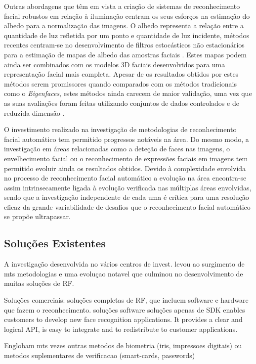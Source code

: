  Outras abordagens que têm em vista a criação de sistemas de reconhecimento facial robustos em relação à iluminação centram os seus esforços na estimação do albedo para a normalização das imagens. O albedo representa a relação entre a quantidade de luz refletida por um ponto e quantidade de luz incidente, métodos recentes centram-se no desenvolvimento de filtros estocásticos não estacionários para a estimação de mapas de albedo das amostras faciais \cite{Biswas2009}. Estes mapas podem ainda ser combinados com os modelos 3D faciais desenvolvidos para uma representação facial mais completa. Apesar de os resultados obtidos por estes métodos serem promissores quando comparados com os métodos tradicionais como o \textit{Eigenfaces}, estes métodos ainda carecem de maior validação, uma vez que as suas avaliações foram feitas utilizando conjuntos de dados controlados e de reduzida dimensão \citep{Chellappa2010}.
 
O investimento realizado na investigação de metodologias de reconhecimento facial automático tem permitido progressos notáveis na área. Do mesmo modo, a investigação em áreas relacionadas como a deteção de faces nas imagens, o envelhecimento facial ou o reconhecimento de expressões faciais em imagens tem permitido evoluir ainda os resultados obtidos. Devido à complexidade envolvida no processo de reconhecimento facial automático a evolução na área encontra-se assim intrinsecamente ligada à evolução verificada nas múltiplas áreas envolvidas, sendo que a investigação independente de cada uma é crítica para uma resolução eficaz da grande variabilidade de desafios que o reconhecimento facial automático se propõe ultrapassar.

\subsection{Soluções Existentes}\label{sec:soluções}
A investigação desenvolvida no vários centros de invest. levou ao surgimento de mts metodologias e uma evoluçao notavel que culminou no desenvolvimento de muitas soluções de RF.

Soluções comerciais:
soluções completas de RF, que incluem software e hardware que fazem o reconhecimento.
soluções software
soluções apenas de SDK enables customers to develop new face recognition applications. It provides a clear and logical API, is easy to integrate and to redistribute to customer applications.

Englobam mts vezes outras metodos de biometria (iris, impressoes digitais) ou metodos suplementares de verificacao (smart-cards, passwords)

